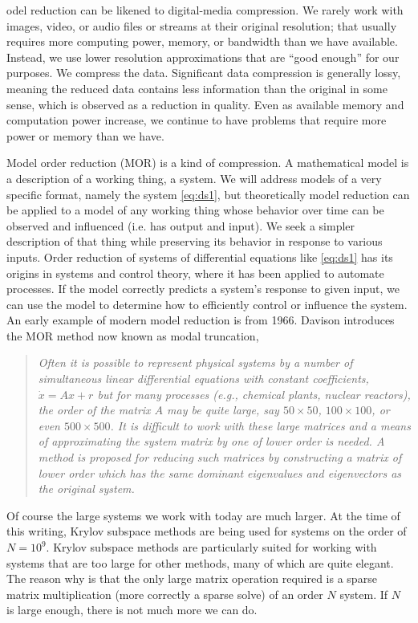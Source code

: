 
odel reduction can be likened to digital-media compression.  We rarely work with images, video, or audio files or streams at their original resolution;  that usually requires more computing power, memory, or bandwidth than we have available.    Instead, we use lower resolution approximations that are ``good enough'' for our purposes.  We compress the data.  Significant data compression is generally lossy, meaning the reduced data contains less information than the original in some sense, which is observed as a reduction in quality.   Even as available memory and computation power increase, we continue to have problems that require more power or memory than we have.   

\smallskip
Model order reduction (MOR) is a kind of compression.   A mathematical model is a description of a working thing, a system.  We will address models of a very specific format, namely the system \eqref{eq:ds1}, but theoretically model reduction can be applied to a model of any working thing whose behavior over time can be observed and influenced (i.e. has output and input).   We seek a simpler description of that thing while preserving its behavior in response to various inputs.  Order reduction of systems of differential equations like \eqref{eq:ds1} has its origins in systems and control theory, where it has been applied to automate processes.   If the model correctly predicts a system's response to given input, we can use the model to determine how to efficiently control or influence the system.  An early example of modern model reduction is \cite{modaltrunc} from 1966.  Davison introduces the MOR method now known as modal truncation,               
\begin{quotation}\itshape
Often it is possible to represent physical systems by a number
of simultaneous linear differential equations with constant coefficients,
$\dot{x}=Ax+r$ but for many processes (e.g., chemical plants, nuclear reactors), the
order of the matrix $A$ may be quite large, say $50\times50$, $100\times100$, or even $500\times500$. It is difficult to work with these large matrices and a means
of approximating the system matrix by one of lower order
is needed. A method is proposed for reducing such matrices by constructing a matrix of lower order which has the same dominant eigenvalues and
eigenvectors as the original system.
\end{quotation}

Of course the large systems we work with today are much larger.  At the time of this writing, Krylov subspace methods are being used for systems on the order of $N=10^9$.   Krylov subspace methods are particularly suited for working with systems that are too large for other methods, many of which are quite elegant.  The reason why is that the only large matrix operation required is a sparse matrix multiplication (more correctly a sparse solve) of an order $N$ system.  If $N$ is large enough, there is not much more we can do. 
    
